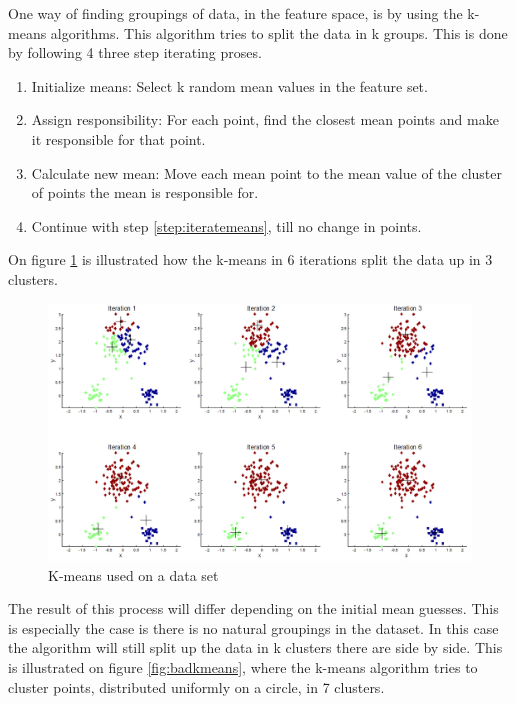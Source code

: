 One way of finding groupings of data, in the feature space, is by using the k-means algorithms. This algorithm tries to split the data in k groups. This is done by following 4 three step iterating proses. 

\begin{enumerate}
  \item Initialize means: Select k random mean values in the feature set. 
  \item Assign responsibility: For each point, find the closest mean points and make it responsible for that point.
  \label{step:iteratemeans} 
  \item Calculate new mean: Move each mean point to the mean value of the cluster of points the mean is responsible for. 
  \item Continue with step \ref{step:iteratemeans}, till no change in points. 
\end{enumerate}

On figure \ref{fig:kmeans} is illustrated how the k-means in 6 iterations split the data up in 3 clusters.

\begin{figure}[H]
\centering
\includegraphics[scale=0.6]{billeder/kmeansclustering}
\caption{K-means used on a data set}
\label{fig:kmeans}
\end{figure}

The result of this process will differ depending on the initial mean guesses. This is especially the case is there is no natural groupings in the dataset. In this case the algorithm will still split up the data in k clusters there are side by side. This is illustrated on figure \ref{fig:badkmeans}, where the k-means algorithm tries to cluster points, distributed uniformly on a circle, in 7 clusters. 

